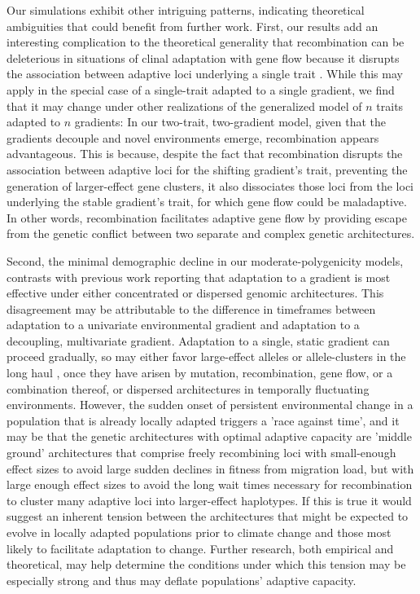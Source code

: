 \documentclass[9pt,twocolumn,twoside,lineno]{pnas-new}
\begin{document}
Our simulations exhibit other intriguing patterns,
indicating theoretical ambiguities that could benefit from further work.
First, our results add an interesting complication
to the theoretical generality that recombination can be deleterious
in situations of clinal adaptation
with gene flow because it disrupts the association between adaptive loci 
underlying a single trait \cite{tigano}.
While this may apply in the special case of a single-trait 
adapted to a single gradient,
we find that it may change under other realizations of the 
generalized model of $n$ traits adapted to $n$ gradients:
In our two-trait, two-gradient model, given that the gradients decouple
and novel environments emerge,
recombination appears advantageous.
This is because, despite the fact that recombination disrupts the association between
adaptive loci for the shifting gradient's trait, preventing the
generation of larger-effect gene clusters,
it also dissociates those loci from the loci underlying
the stable gradient's trait, for which gene flow could be maladaptive.
In other words, recombination facilitates adaptive gene flow
by providing escape from the genetic conflict between
two separate and complex genetic architectures.
 
Second, the minimal demographic decline
in our moderate-polygenicity models,
contrasts with previous work reporting that adaptation
to a gradient is most effective under either
concentrated or dispersed genomic architectures.
This disagreement may be attributable to the
difference in timeframes between adaptation to a univariate environmental gradient
and adaptation to a decoupling, multivariate gradient.
Adaptation to a single, static gradient can proceed gradually,
so may either favor large-effect alleles or allele-clusters in the long haul
\cite{yeaman_amnat,yeaman_review},
once they have arisen by mutation, recombination, gene flow, or a combination thereof,
or dispersed architectures 
\cite{burger,kondrashov,yeaman_review,yeaman_whitlock}
in temporally fluctuating environments.
However, the sudden onset of persistent environmental change 
in a population that is already locally adapted triggers a 'race against time', 
and it may be that the genetic architectures with
optimal adaptive capacity are 'middle ground' architectures that comprise
freely recombining loci with small-enough effect sizes to avoid large
sudden declines in fitness from migration load,
but with large enough effect sizes to avoid the long wait times necessary
for recombination to cluster many adaptive loci into larger-effect haplotypes.
If this is true it would suggest an inherent tension between the architectures that
might be expected to evolve in locally adapted populations prior to climate change
and those most likely to facilitate adaptation to change.
Further research, both empirical and theoretical,
may help determine the conditions under which this tension
may be especially strong and thus may deflate
populations' adaptive capacity.
 
\end{document}
